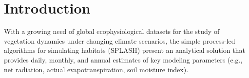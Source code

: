 %
%
%
%
%
\section{Introduction}
\label{sec:intro}
With a growing need of global ecophysiological datasets for the study of vegetation dynamics under changing climate scenarios, the simple process-led algorithms for simulating habitats (SPLASH) present an analytical solution that provides daily, monthly, and annual estimates of key modeling parameters (e.g., net radiation, actual evapotranspiration, soil moisture index).

